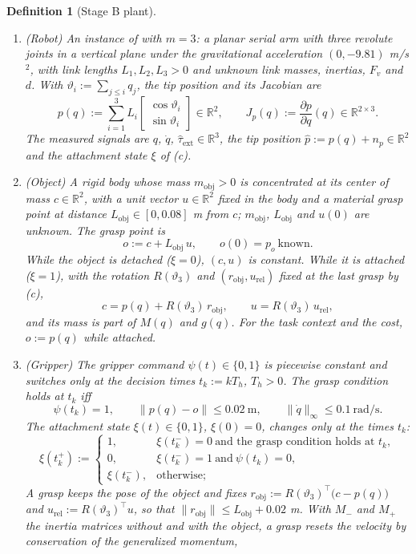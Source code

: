 \documentclass[11pt]{article}\usepackage[margin=1in]{geometry}\usepackage{amsmath,amssymb,amsthm,mathtools}\usepackage{graphicx}\graphicspath{{figures/}{../figures/}{figs/}{./}}\usepackage{enumitem}\usepackage{hyperref}\usepackage{cleveref}\usepackage{tikz}\usetikzlibrary{arrows.meta,positioning,calc,shapes.geometric}\usepackage{float}\usepackage{rotating}\usepackage[most]{tcolorbox}\usepackage{kotex}\usepackage{booktabs}\usepackage{longtable}\emergencystretch=1.6em\tolerance=2000 \crefname{assumption}{Assumption}{Assumptions}\Crefname{assumption}{Assumption}{Assumptions}\crefname{definition}{Definition}{Definitions}\Crefname{definition}{Definition}{Definitions}\crefname{proposition}{Proposition}{Propositions}\Crefname{proposition}{Proposition}{Propositions}\crefname{fact}{Fact}{Facts}\Crefname{fact}{Fact}{Facts} \newtheorem{assumption}{Assumption}\newtheorem{definition}{Definition}\newtheorem{lemma}{Lemma}\newtheorem{proposition}{Proposition}\newtheorem{theorem}{Theorem}\newtheorem{corollary}{Corollary}\newtheorem{fact}{Fact}\theoremstyle{remark}\newtheorem{remark}{Remark} \newcommand{\R}{\mathbb{R}}\newcommand{\xb}{\bar x}\newcommand{\Ab}{\bar A}\newcommand{\By}{\bar B_y}\newcommand{\U}{\mathcal U}\newcommand{\Z}{\mathcal Z}
\begin{document}
\begin{definition}[Stage B plant]
\label{def:stageBplant}
\begin{enumerate}[label=(\alph*)]
\item (Robot) An instance of  with $m=3$: a planar serial arm with three revolute joints in a vertical plane under the gravitational acceleration $(0,-9.81)$ m/s$^2$, with link lengths $L_1,L_2,L_3>0$ and unknown link masses, inertias, $F_v$ and $d$. With $\vartheta_i:=\sum_{j\le i}q_j$, the tip position and its Jacobian are
\[
p(q):=\sum_{i=1}^{3}L_i\begin{bmatrix}\cos\vartheta_i\\ \sin\vartheta_i\end{bmatrix}\in\R^2,\qquad J_p(q):=\frac{\partial p}{\partial q}(q)\in\R^{2\times3}.
\]
The measured signals are $q$, $\dot q$, $\hat\tau_{\mathrm{ext}}\in\R^3$, the tip position $\hat p:=p(q)+n_p\in\R^2$ and the attachment state $\xi$ of (c).
\item (Object) A rigid body whose mass $m_{\mathrm{obj}}>0$ is concentrated at its center of mass $c\in\R^2$, with a unit vector $u\in\R^2$ fixed in the body and a material grasp point at distance $L_{\mathrm{obj}}\in[0,0.08]$ m from $c$; $m_{\mathrm{obj}}$, $L_{\mathrm{obj}}$ and $u(0)$ are unknown. The grasp point is
\[
o:=c+L_{\mathrm{obj}}\,u,\qquad o(0)=p_o\ \text{known}.
\]
While the object is detached ($\xi=0$), $(c,u)$ is constant. While it is attached ($\xi=1$), with the rotation $R(\vartheta_3)$ and $(r_{\mathrm{obj}},u_{\mathrm{rel}})$ fixed at the last grasp by (c),
\[
c=p(q)+R(\vartheta_3)\,r_{\mathrm{obj}},\qquad u=R(\vartheta_3)\,u_{\mathrm{rel}},
\]
and its mass is part of $M(q)$ and $g(q)$. For the task context and the cost, $o:=p(q)$ while attached.
\item (Gripper) The gripper command $\psi(t)\in\{0,1\}$ is piecewise constant and switches only at the decision times $t_k:=kT_h$, $T_h>0$. The grasp condition holds at $t_k$ iff
\[
\psi(t_k)=1,\qquad \|p(q)-o\|\le0.02\ \mathrm m,\qquad \|\dot q\|_\infty\le0.1\ \mathrm{rad/s}.
\]
The attachment state $\xi(t)\in\{0,1\}$, $\xi(0)=0$, changes only at the times $t_k$:
\[
\xi(t_k^+):=\begin{cases}1, & \xi(t_k^-)=0\ \text{and the grasp condition holds at }t_k,\\ 0, & \xi(t_k^-)=1\ \text{and}\ \psi(t_k)=0,\\ \xi(t_k^-), & \text{otherwise};\end{cases}
\]
A grasp keeps the pose of the object and fixes $r_{\mathrm{obj}}:=R(\vartheta_3)^\top\big(c-p(q)\big)$ and $u_{\mathrm{rel}}:=R(\vartheta_3)^\top u$, so that $\|r_{\mathrm{obj}}\|\le L_{\mathrm{obj}}+0.02$ m. With $M_-$ and $M_+$ the inertia matrices without and with the object, a grasp resets the velocity by conservation of the generalized momentum,

\end{enumerate}
\end{definition}
\end{document}
